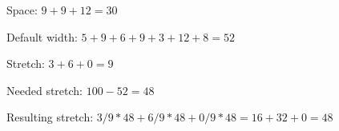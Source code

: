 Space: $9 + 9 + 12 = 30$

Default width: $5 + 9 + 6 + 9 + 3 + 12 + 8 = 52$

Stretch: $3 + 6 + 0 = 9$

Needed stretch: $100 - 52 = 48$

Resulting stretch: $3/9*48 + 6/9*48 + 0/9*48 = 16 + 32 + 0 = 48$
